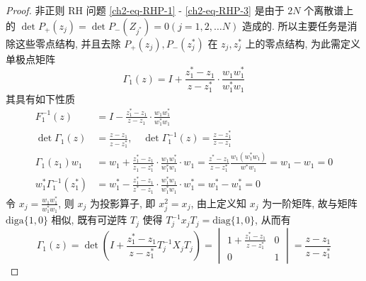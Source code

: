 \begin{proof}
    非正则 RH 问题  \eqref{ch2-eq-RHP-1} - \eqref{ch2-eq-RHP-3} 是由于 $ 2N $ 个离散谱上的 $ \det P_{+}(z_{j}) = \det P_{-}(Z_{j^{*}}) = 0 (j = 1,2, \dots N) $ 造成的. 所以主要任务是消除这些零点结构, 并且去除 $ P_{+}(z_{j}), P_{-}(z_{j}^{*}) $ 在 $ z_{j}, z_{j}^{*} $ 上的零点结构, 为此需定义单极点矩阵
    \begin{equation}
        \Gamma_{1}(z) = I + \frac{z^{*}_{1} - z_{1}}{z - z_{1}^{*}} \cdot \frac{w_{1}w^{*}_{1}}{w^{*}_{1} w_{1}}
    \end{equation}
    其具有如下性质
    \begin{equation}
        \begin{aligned}
            F_{1}^{-1}(z)                       & = I - \frac{z_{1}^{*} - z_{1}}{z - z_{1}} \cdot \frac{w_{1}w^{*}_{1}}{w^{*}_{1} w_{1}}                                                                                                                           \\
            \det \Gamma_{1}(z)                  & = \frac{z - z_{1}}{z - z_{1}^{*}}, \quad \det \Gamma_{1}^{-1}(z) = \frac{z - z_{1}^{*}}{z - z_{1}}                                                                                                               \\
            \Gamma_{1}(z_{1}) w_{1}             & = w_{1} + \frac{z^{*}_{1} - z_{1}}{z_{1} - z_{1}^{*}} \cdot \frac{w_{1}w_{1}^{*}}{w^{*}_{1}w_{1}} \cdot w_{1} = \frac{z^{*} - z_{1}}{z - z^{*}_{1}} \frac{w_{1}(w_{1}^{*}w_{1})}{w^{*}w_{1}} = w_{1} - w_{1} = 0 \\
            w_{1}^{*}\Gamma_{1}^{-1}(z^{*}_{1}) & = w_{1}^{*} - \frac{z_{1}^{*} - z_{1}}{z^{*} - z_{1}} \cdot \frac{w_{1}^{*}w_{1}}{w_{1}^{*}w_{1}} \cdot w_{1}^{*} = w_{1}^{*} - w_{1}^{*} = 0
        \end{aligned}
    \end{equation}
    令 $ x_{j} = \frac{w_{1}w_{1}^{*}}{w_{1}^{*}w_{1}} $, 则 $ x_{j} $ 为投影算子, 即 $ x_{j}^{2} = x_{j} $, 由上定义知 $ x_{j} $ 为一阶矩阵, 故与矩阵 $ \text{diga}\{1,0\} $ 相似, 既有可逆阵 $ T_{j} $ 使得 $ T_{j}^{-1} x_{j} T_{j} = \textrm{diag}\{1,0\} $, 从而有
    \begin{equation}
        \Gamma_{1}(z) = \det \left(I + \frac{z_{1}^{*} - z_{1}}{z - z_{1}^{*}} T_{j}^{-1}X_{j}T_{j}\right) = \begin{vmatrix}
            1 + \frac{z_{1}^{*} - z_{1}}{z - z_{1}^{*}} & 0 \\ 0 & 1
        \end{vmatrix} = \frac{z - z_{1}}{z - z^{*}_{1}}

\end{equation}
\end{proof}
